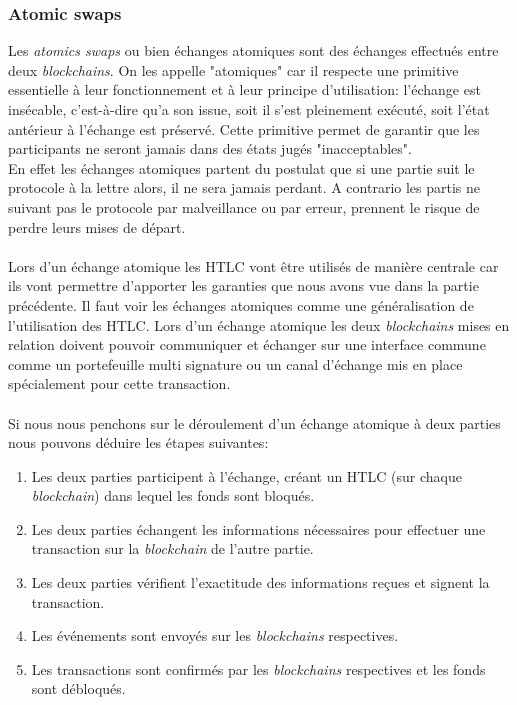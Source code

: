 \subsubsection{Atomic swaps}
Les \textit{atomics swaps} ou bien échanges atomiques sont des échanges effectués entre deux \textit{blockchains}. On les appelle "atomiques" car il respecte une primitive essentielle à leur fonctionnement et à leur principe d'utilisation: 
l'échange est insécable, c'est-à-dire qu'a son issue, soit il s'est pleinement exécuté, soit l'état antérieur à l'échange est préservé.
Cette primitive permet de garantir que les participants ne seront jamais dans des états jugés "inacceptables". \\
En effet les échanges atomiques partent du postulat que si une partie suit le protocole à la lettre alors, 
il ne sera jamais perdant. A contrario les partis ne suivant pas le protocole par malveillance ou par erreur, prennent le risque de perdre leurs mises de départ.\\ \\
Lors d'un échange atomique les HTLC vont être utilisés de manière centrale car ils vont permettre d'apporter les garanties que nous avons vue dans la partie précédente. Il faut voir les échanges atomiques comme une généralisation de l'utilisation des HTLC. Lors d'un échange atomique les deux \textit{blockchains} mises en relation doivent pouvoir communiquer et échanger sur une interface commune comme un portefeuille multi signature ou un canal d'échange mis en place spécialement pour cette transaction. \\ \\
Si nous nous penchons sur le déroulement d'un échange atomique à deux parties nous pouvons déduire les étapes suivantes: 
\begin{enumerate}
    \item Les deux parties participent à l'échange, créant un HTLC (sur chaque \textit{blockchain}) dans lequel les fonds sont bloqués. 
    \item Les deux parties échangent les informations nécessaires pour effectuer une transaction sur la \textit{blockchain} de l'autre partie. 
    \item Les deux parties vérifient l'exactitude des informations reçues et signent la transaction. 
    \item Les événements sont envoyés sur les \textit{blockchains} respectives. 
    \item Les transactions sont confirmés par les \textit{blockchains} respectives et les fonds sont débloqués.
\end{enumerate}

